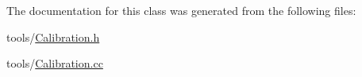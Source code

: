 The documentation for this class was generated from the following files:\begin{CompactItemize}
\item 
tools/\hyperlink{_calibration_8h}{Calibration.h}\item 
tools/\hyperlink{_calibration_8cc}{Calibration.cc}\end{CompactItemize}
